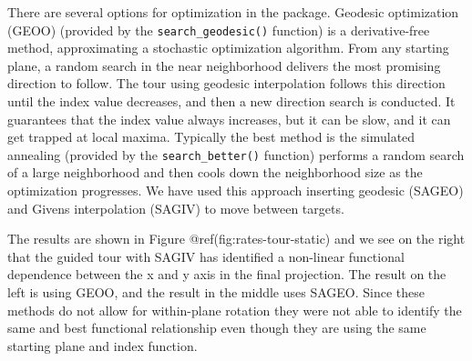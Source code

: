 \documentclass[
]{article}
\begin{document}
There are several options for optimization in the 
package. Geodesic optimization (GEOO) (provided by the
\texttt{search\_geodesic()} function) is a derivative-free method,
approximating a stochastic optimization algorithm. From any starting
plane, a random search in the near neighborhood delivers the most
promising direction to follow. The tour using geodesic interpolation
follows this direction until the index value decreases, and then a new
direction search is conducted. It guarantees that the index value always
increases, but it can be slow, and it can get trapped at local maxima.
Typically the best method is the simulated annealing (provided by the
\texttt{search\_better()} function) performs a random search of a large
neighborhood and then cools down the neighborhood size as the
optimization progresses. We have used this approach inserting geodesic
(SAGEO) and Givens interpolation (SAGIV) to move between targets.

The results are shown in Figure @ref(fig:rates-tour-static) and we see
on the right that the guided tour with SAGIV has identified a non-linear
functional dependence between the x and y axis in the final projection.
The result on the left is using GEOO, and the result in the middle uses
SAGEO. Since these methods do not allow for within-plane rotation they
were not able to identify the same and best functional relationship even
though they are using the same starting plane and index function.
\end{document}
